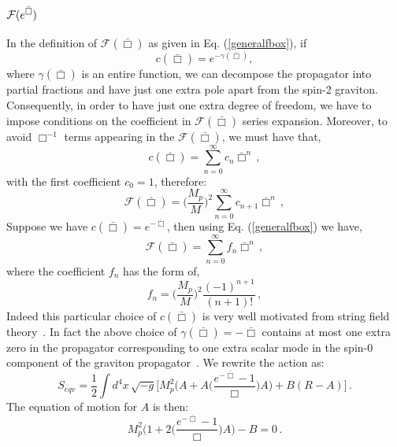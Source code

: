 \documentclass[a4paper,12pt]{article}
\newcommand{\bbox}{\bar{\Box}}
\newcommand{\+}{^{\dagger}}
\newcommand{\2}{\frac{1}{2}}
\newcommand{\3}{\frac{1}{3}}
\newcommand{\4}{\frac{1}{4}}
\newcommand{\6}{\frac{1}{6}}
\newcommand{\8}{\frac{1}{8}}
\begin{document}

\subsection{ ${\cal F}(e^{\bbox}) $}

In the definition of $\mathcal{F}(\bbox)$ as given in Eq. (\ref{generalfbox}), if 
\begin{equation}
c(\bbox)= e^{-\gamma(\bbox)},
\end{equation}
%
where $\gamma (\bbox)$ is an entire function, we can decompose the propagator into partial fractions and have just one extra pole apart from the spin-2 graviton. Consequently, in order to have just one extra degree of freedom, we have to impose conditions on the coefficient in $\mathcal{F}(\bbox)$ series expansion. Moreover, to avoid $\Box^{-1}$ terms appearing in the $\mathcal{F}(\bbox)$, we must have that, 
\begin{equation}
c(\bbox)=\sum^{\infty}_{n=0}c_n\bbox^n\,,
\end{equation}
with the first coefficient $c_0=1$, therefore: 
\begin{equation}
\mathcal{F}(\bbox)=\Big(\frac{M_p}{M}\Big)^{2}\sum^{\infty}_{n=0}c_{{n+1}}\bbox^{n}\,,
\end{equation}
Suppose we have $c(\bbox)=e^{-\bbox}$, then using Eq. (\ref{generalfbox}) we have, 
 \begin{equation}
\mathcal{F}(\bbox)=\sum^{\infty}_{n=0}f_n\bbox^n\,,
\end{equation}
where the coefficient $f_n$ has the form of, 
\begin{equation}
f_n=\Big(\frac{M_p}{M}\Big)^{2}\frac{(-1)^{n+1}}{(n+1)!}\,,
\end{equation}
Indeed this particular choice of $c(\bbox)$ is very well motivated from string field theory~\cite{Biswas:2005qr}. In fact the above choice of $\gamma(\bbox )=-\bbox$ contains at most one extra zero in the propagator corresponding to one extra scalar mode in the spin-0 component of the graviton propagator~\cite{Biswas:2011ar,Biswas:2013kla}. We rewrite the action as: 
\begin{equation}\label{goodaction}
S_{eqv}=\frac{1}{2}\int d^{4} x \, \sqrt{-g}\bigg[M^{2}_{p}\bigg(A+A\big(\frac{e^{-\bbox}-1}{\Box}\big)A\bigg )+B(R-A)\bigg]\,.
\end{equation}
The equation of motion for $A$ is then:
\begin{equation}
M^{2}_{p}\bigg(1+2\big(\frac{e^{-\bbox}-1}{\Box}\big)A\bigg
)-B=0\,.
\end{equation}
\end{document}

